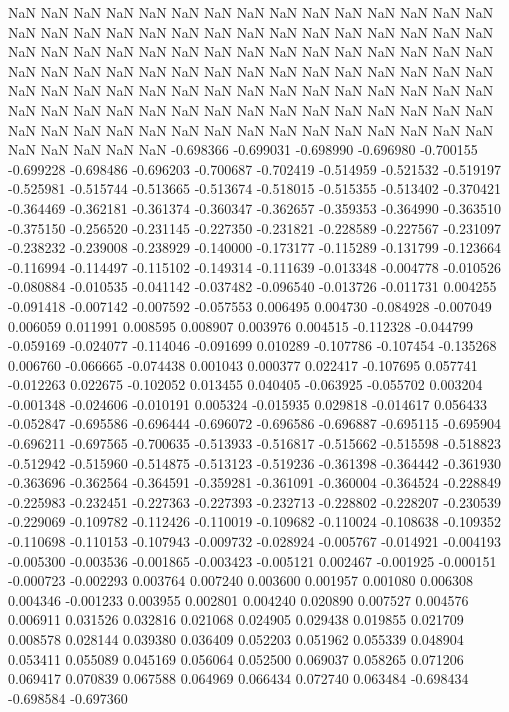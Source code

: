 NaN
NaN
NaN
NaN
NaN
NaN
NaN
NaN
NaN
NaN
NaN
NaN
NaN
NaN
NaN
NaN
NaN
NaN
NaN
NaN
NaN
NaN
NaN
NaN
NaN
NaN
NaN
NaN
NaN
NaN
NaN
NaN
NaN
NaN
NaN
NaN
NaN
NaN
NaN
NaN
NaN
NaN
NaN
NaN
NaN
NaN
NaN
NaN
NaN
NaN
NaN
NaN
NaN
NaN
NaN
NaN
NaN
NaN
NaN
NaN
NaN
NaN
NaN
NaN
NaN
NaN
NaN
NaN
NaN
NaN
NaN
NaN
NaN
NaN
NaN
NaN
NaN
NaN
NaN
NaN
NaN
NaN
NaN
NaN
NaN
NaN
NaN
NaN
NaN
NaN
NaN
NaN
NaN
NaN
NaN
NaN
NaN
NaN
NaN
NaN
NaN
NaN
NaN
NaN
NaN
NaN
NaN
NaN
NaN
NaN
-0.698366
-0.699031
-0.698990
-0.696980
-0.700155
-0.699228
-0.698486
-0.696203
-0.700687
-0.702419
-0.514959
-0.521532
-0.519197
-0.525981
-0.515744
-0.513665
-0.513674
-0.518015
-0.515355
-0.513402
-0.370421
-0.364469
-0.362181
-0.361374
-0.360347
-0.362657
-0.359353
-0.364990
-0.363510
-0.375150
-0.256520
-0.231145
-0.227350
-0.231821
-0.228589
-0.227567
-0.231097
-0.238232
-0.239008
-0.238929
-0.140000
-0.173177
-0.115289
-0.131799
-0.123664
-0.116994
-0.114497
-0.115102
-0.149314
-0.111639
-0.013348
-0.004778
-0.010526
-0.080884
-0.010535
-0.041142
-0.037482
-0.096540
-0.013726
-0.011731
0.004255
-0.091418
-0.007142
-0.007592
-0.057553
0.006495
0.004730
-0.084928
-0.007049
0.006059
0.011991
0.008595
0.008907
0.003976
0.004515
-0.112328
-0.044799
-0.059169
-0.024077
-0.114046
-0.091699
0.010289
-0.107786
-0.107454
-0.135268
0.006760
-0.066665
-0.074438
0.001043
0.000377
0.022417
-0.107695
0.057741
-0.012263
0.022675
-0.102052
0.013455
0.040405
-0.063925
-0.055702
0.003204
-0.001348
-0.024606
-0.010191
0.005324
-0.015935
0.029818
-0.014617
0.056433
-0.052847
-0.695586
-0.696444
-0.696072
-0.696586
-0.696887
-0.695115
-0.695904
-0.696211
-0.697565
-0.700635
-0.513933
-0.516817
-0.515662
-0.515598
-0.518823
-0.512942
-0.515960
-0.514875
-0.513123
-0.519236
-0.361398
-0.364442
-0.361930
-0.363696
-0.362564
-0.364591
-0.359281
-0.361091
-0.360004
-0.364524
-0.228849
-0.225983
-0.232451
-0.227363
-0.227393
-0.232713
-0.228802
-0.228207
-0.230539
-0.229069
-0.109782
-0.112426
-0.110019
-0.109682
-0.110024
-0.108638
-0.109352
-0.110698
-0.110153
-0.107943
-0.009732
-0.028924
-0.005767
-0.014921
-0.004193
-0.005300
-0.003536
-0.001865
-0.003423
-0.005121
0.002467
-0.001925
-0.000151
-0.000723
-0.002293
0.003764
0.007240
0.003600
0.001957
0.001080
0.006308
0.004346
-0.001233
0.003955
0.002801
0.004240
0.020890
0.007527
0.004576
0.006911
0.031526
0.032816
0.021068
0.024905
0.029438
0.019855
0.021709
0.008578
0.028144
0.039380
0.036409
0.052203
0.051962
0.055339
0.048904
0.053411
0.055089
0.045169
0.056064
0.052500
0.069037
0.058265
0.071206
0.069417
0.070839
0.067588
0.064969
0.066434
0.072740
0.063484
-0.698434
-0.698584
-0.697360
